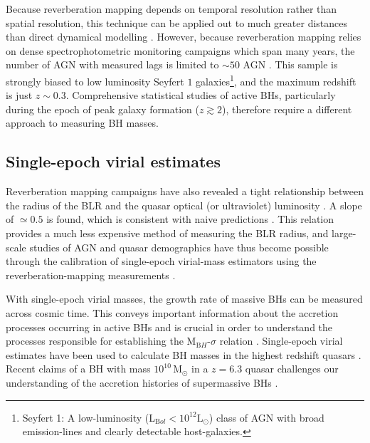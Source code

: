 Because reverberation mapping depends on temporal resolution rather than spatial resolution, this technique can be applied out to much greater distances than direct dynamical modelling \citep[e.g.][]{kormendy13}.
However, because reverberation mapping relies on dense spectrophotometric monitoring campaigns which span many years, the number of AGN with measured lags is limited to $\sim50$ AGN \citep[e.g.][]{kaspi00,peterson04,kaspi07,bentz09,denney10,barth11,grier12}. 
This sample is strongly biased to low luminosity Seyfert $1$ galaxies\footnote{Seyfert 1: A low-luminosity (L$_{\mathrm Bol} < 10^{12}{\mathrm L}_{\odot}$) class of AGN with broad emission-lines and clearly detectable host-galaxies.}, and the maximum redshift is just $z\sim0.3$. 
Comprehensive statistical studies of active BHs, particularly during the epoch of peak galaxy formation ($z\gtrsim2$), therefore require a different approach to measuring BH masses. 

\subsection{Single-epoch virial estimates}

Reverberation mapping campaigns have also revealed a tight relationship between the radius of the BLR and the quasar optical (or ultraviolet) luminosity \citep[the ${\mathrm R_{BLR}-L}$ relation; e.g.][]{kaspi00,kaspi07}.
A slope of $\simeq0.5$ is found, which is consistent with naive predictions \citep[e.g.][]{peterson97}. 
This relation provides a much less expensive method of measuring the BLR radius, and large-scale studies of AGN and quasar demographics \citep[e.g.][]{greene05b,vestergaard06,vestergaard09,shen11,shen12,trakhtenbrot12} have thus become possible through the calibration of single-epoch virial-mass estimators using the reverberation-mapping measurements \citep[e.g.][]{vestergaard02,mclure02,vestergaard06,mcgill08,wang09,rafiee11,park13}.

With single-epoch virial masses, the growth rate of massive BHs can be measured across cosmic time. 
This conveys important information about the accretion processes occurring in active BHs \citep[e.g.][]{kollmeier06} and is crucial in order to understand the processes responsible for establishing the M$_{\mathrm BH}$-$\sigma$ relation \citep[e.g.][]{bennert11}.
Single-epoch virial estimates have been used to calculate BH masses in the highest redshift quasars \citep[e.g. a $10^9$\,M$_\odot$ BH in a redshift $z\sim7$ quasar;][]{mortlock11}. 
Recent claims of a BH with mass $10^{10}$\,M$_\odot$ in a $z=6.3$ quasar \citep[when the Universe is less than $1$ Gyr old;][]{wu15} challenges our understanding of the accretion histories of supermassive BHs \citep[e.g.][]{willott03}. 

